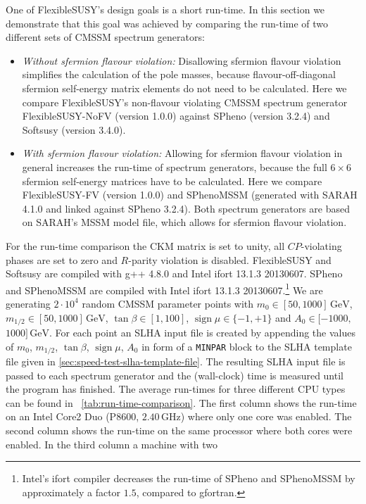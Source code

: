 \documentclass[final,3p,11pt,pdflatex]{elsarticle}
\makeatletter
\newcommand{\fs}{FlexibleSUSY\@\xspace}
\newcommand{\code}[1]{\lstinline|#1|}  %
\newcommand{\unit}[1]{\,\text{#1}}      %
\newcommand{\tabref}[1]{\tablename~\ref{#1}}
\DeclareMathOperator{\sign}{sign}
\makeatother
\begin{document}
One of \fs's design goals is a short run-time.  In this section we
demonstrate that this goal was achieved by comparing the run-time of
two different sets of CMSSM spectrum generators:
%
\begin{itemize}
\item \emph{Without sfermion flavour violation:} Disallowing sfermion
  flavour violation simplifies the calculation of the pole masses,
  because flavour-off-diagonal sfermion self-energy matrix elements
  do not need to be calculated.  Here we compare \fs's non-flavour
  violating CMSSM spectrum generator FlexibleSUSY-NoFV (version 1.0.0)
  against SPheno (version 3.2.4) and Softsusy (version 3.4.0).
%
\item \emph{With sfermion flavour violation:} Allowing for sfermion
  flavour violation in general increases the run-time of spectrum
  generators, because the full $6\times 6$ sfermion self-energy
  matrices have to be calculated.  Here we compare FlexibleSUSY-FV
  (version 1.0.0) and SPhenoMSSM (generated with SARAH 4.1.0 and
  linked against SPheno 3.2.4).  Both spectrum generators are based on
  SARAH's MSSM model file, which allows for sfermion flavour
  violation.
\end{itemize}
%
For the run-time comparison the CKM matrix is set to unity, all
$CP$-violating phases are set to zero and $R$-parity violation is
disabled.  \fs and Softsusy are compiled with g++ 4.8.0 and Intel
ifort 13.1.3 20130607.  SPheno and SPhenoMSSM are compiled with Intel
ifort 13.1.3 20130607.\footnote{Intel's ifort compiler decreases the
  run-time of SPheno and SPhenoMSSM by approximately a factor $1.5$,
  compared to gfortran.}  We are generating $2\cdot 10^{4}$ random
CMSSM parameter points with $m_0\in [50,1000]\unit{GeV}$, $m_{1/2}\in
[50,1000]\unit{GeV}$, $\tan\beta\in [1,100]$, $\sign\mu\in \{-1,+1\}$
and $A_0\in [-1000,$ $1000]\unit{GeV}$.  For each point an SLHA input
file is created by appending the values of $m_0$, $m_{1/2}$,
$\tan\beta$, $\sign\mu$, $A_0$ in form of a \code{MINPAR} block to the
SLHA template file given in \ref{sec:speed-test-slha-template-file}.
The resulting SLHA input file is passed to each spectrum generator and
the (wall-clock) time is measured until the program has finished.  The
average run-times for three different CPU types can be found in
\tabref{tab:run-time-comparison}.  The first column shows the run-time
on an Intel Core2 Duo (P8600, $2.40\unit{GHz}$) where only one core was
enabled.  The second column shows the run-time on the same processor
where both cores were enabled.  In the third column a machine with two
\end{document}
